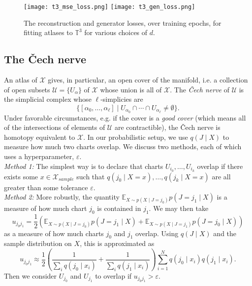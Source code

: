 \documentclass[reqno,11pt]{article}
\newcommand{\eps}{\varepsilon}
\newcommand{\U}{\mathcal U}
\newcommand{\X}{\mathcal{X}}
\newcommand{\E}{\mathbb E}
\begin{document}
\begin{figure}[h]
\centering
\captionsetup{width=.75\linewidth}
\texttt{[image: t3\_mse\_loss.png]} \texttt{[image: t3\_gen\_loss.png]}
\caption{The reconstruction and generator losses, over training epochs, for fitting atlases to $\mathbb T^3$ for various choices of $d$.}
\label{T3-losses}
\end{figure}

\subsection{The \v Cech nerve}
An atlas of $\X$ gives, in particular, an open cover of the manifold, i.e. a collection of open subsets $\mathcal U = \{U_\alpha\}$ of $\X$ whose union is all of $\X$. The \textit{\v Cech nerve} of $\U$ is the simplicial complex whose $\ell$-simplicies are
\[
\{[\alpha_0, \ldots, \alpha_\ell] \mid U_{\alpha_0} \cap \cdots\cap U_{\alpha_\ell} \ne \emptyset \}.
\]
Under favorable circumstances, e.g. if the cover is a \textit{good cover} (which means all of the intersections of elements of $\U$ are contractible), the \v Cech nerve is homotopy equivalent to $\X$. In our probabilistic setup, we use $q(J \mid X)$ to measure how much two charts overlap. We discuss two methods, each of which uses a hyperparameter, $\eps$. \\

\textit{Method 1:} The simplest way is to declare that charts $U_{i_0}, \ldots, U_{i_k}$ overlap if there exists some $x \in \X_{sample}$ such that $q(j_0 \mid X=x), \ldots, q(j_k \mid X=x)$ are all greater than some tolerance $\eps$. \\

\textit{Method 2:} More robustly, the quantity $\E_{X\sim p(X\mid J=j_0)} p(J=j_1 \mid X)$ is a measure of how much chart $j_0$ is contained in $j_1$. We may then take
\[
u_{j_0j_1} = \frac{1}{2} \left(\E_{X \sim p(X \mid J=j_0)} p(J = j_1 \mid X) + \E_{X \sim p(X \mid J=j_1)} p(J = j_0 \mid X) \right) 
\]
as a measure of how much charts $j_0$ and $j_1$ overlap. Using $q(J\mid X)$ and the sample distribution on $X$, this is approximated as
\begin{equation}
u_{j_0j_1} \approx \frac{1}{2}\left( \frac{1}{\sum_i  q(j_0 \mid x_i)} + \frac{1}{\sum_i q(j_1 \mid x_i)} \right) \sum_{i=1}^N q(j_0 \mid x_i) q(j_1 \mid x_i). \label{doubleoverlap}
\end{equation}
Then we consider $U_{j_0}$ and $U_{j_1}$ to overlap if $u_{j_0 j_1} > \eps$.
\end{document}
